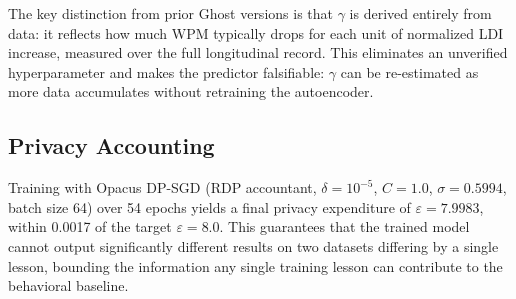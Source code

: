 The key distinction from prior Ghost versions is that $\gamma$ is derived
entirely from data: it reflects how much WPM typically drops for each unit
of normalized LDI increase, measured over the full longitudinal record.
This eliminates an unverified hyperparameter and makes the predictor
falsifiable: $\gamma$ can be re-estimated as more data accumulates without
retraining the autoencoder.

\subsection{Privacy Accounting}
\label{sec:privacy}

Training with Opacus DP-SGD (RDP accountant, $\delta{=}10^{-5}$, $C{=}1.0$,
$\sigma{=}0.5994$, batch size 64) over 54 epochs yields a final privacy
expenditure of $\varepsilon{=}7.9983$, within 0.0017 of the target $\varepsilon{=}8.0$.
This guarantees that the trained model cannot output significantly different
results on two datasets differing by a single lesson, bounding the
information any single training lesson can contribute to the behavioral baseline.
